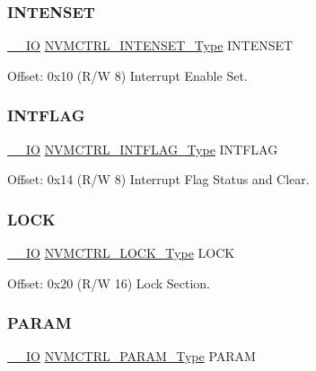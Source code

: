 \subsubsection{\texorpdfstring{INTENSET}{INTENSET}}
{\footnotesize\ttfamily \mbox{\hyperlink{core__cm0plus_8h_aec43007d9998a0a0e01faede4133d6be}{\+\_\+\+\_\+\+IO}} \mbox{\hyperlink{union_n_v_m_c_t_r_l___i_n_t_e_n_s_e_t___type}{N\+V\+M\+C\+T\+R\+L\+\_\+\+I\+N\+T\+E\+N\+S\+E\+T\+\_\+\+Type}} I\+N\+T\+E\+N\+S\+ET}



Offset\+: 0x10 (R/W 8) Interrupt Enable Set. 

\mbox{\label{struct_nvmctrl_a369472a8cad471612f923050e9c6cf9b}} 
\subsubsection{\texorpdfstring{INTFLAG}{INTFLAG}}
{\footnotesize\ttfamily \mbox{\hyperlink{core__cm0plus_8h_aec43007d9998a0a0e01faede4133d6be}{\+\_\+\+\_\+\+IO}} \mbox{\hyperlink{union_n_v_m_c_t_r_l___i_n_t_f_l_a_g___type}{N\+V\+M\+C\+T\+R\+L\+\_\+\+I\+N\+T\+F\+L\+A\+G\+\_\+\+Type}} I\+N\+T\+F\+L\+AG}



Offset\+: 0x14 (R/W 8) Interrupt Flag Status and Clear. 

\mbox{\label{struct_nvmctrl_a6d3c2a6df1a09849e28a79af84eb49ac}} 
\subsubsection{\texorpdfstring{LOCK}{LOCK}}
{\footnotesize\ttfamily \mbox{\hyperlink{core__cm0plus_8h_aec43007d9998a0a0e01faede4133d6be}{\+\_\+\+\_\+\+IO}} \mbox{\hyperlink{union_n_v_m_c_t_r_l___l_o_c_k___type}{N\+V\+M\+C\+T\+R\+L\+\_\+\+L\+O\+C\+K\+\_\+\+Type}} L\+O\+CK}



Offset\+: 0x20 (R/W 16) Lock Section. 

\mbox{\label{struct_nvmctrl_ab90ff7c4565b7c2e2da76c4076ad6c6d}} 
\subsubsection{\texorpdfstring{PARAM}{PARAM}}
{\footnotesize\ttfamily \mbox{\hyperlink{core__cm0plus_8h_aec43007d9998a0a0e01faede4133d6be}{\+\_\+\+\_\+\+IO}} \mbox{\hyperlink{union_n_v_m_c_t_r_l___p_a_r_a_m___type}{N\+V\+M\+C\+T\+R\+L\+\_\+\+P\+A\+R\+A\+M\+\_\+\+Type}} P\+A\+R\+AM}



